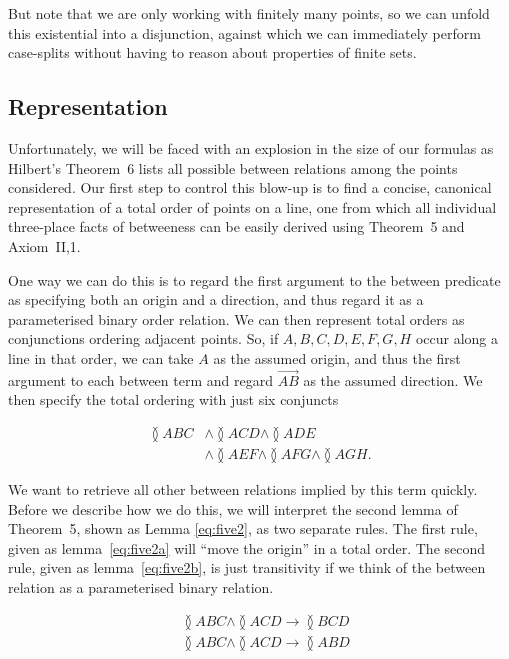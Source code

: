 But note that we are only working with finitely many points, so we can unfold this existential into a disjunction, against which we can immediately perform case-splits without having to reason about properties of finite sets. 

\subsection{Representation}
Unfortunately, we will be faced with an explosion in the size of our formulas as Hilbert's Theorem~6 lists all possible between relations among the points considered. Our first step to control this blow-up is to find a concise, canonical representation of a total order of points on a line, one from which all individual three-place facts of betweeness can be easily derived using Theorem~5 and Axiom~II,1. 

One way we can do this is to regard the first argument to the between predicate as specifying both an origin and a direction, and thus regard it as a parameterised binary order relation. We can then represent total orders as conjunctions ordering adjacent points. So, if $A,B,C,D,E,F,G,H$ occur along a line in that order, we can take $A$ as the assumed origin, and thus the first argument to each between term and regard $\overrightarrow{AB}$ as the assumed direction. We then specify the total ordering with just six conjuncts

\begin{align*}\label{theorem:OrderRepExample}
\between{A}{B}{C}& \wedge \between{A}{C}{D} \wedge \between{A}{D}{E}\tag{$\star$}\\
           &\wedge\between{A}{E}{F}\wedge\between{A}{F}{G}\wedge\between{A}{G}{H}.
\end{align*}

We want to retrieve all other between relations implied by this term quickly. Before we describe how we do this, we will interpret the second lemma of Theorem~5, shown as Lemma \eqref{eq:five2}, as two separate rules. The first rule, given as lemma~\eqref{eq:five2a} will ``move the origin'' in a total order. The second rule, given as lemma~\eqref{eq:five2b}, is just transitivity if we think of the between relation as a parameterised binary relation.

\begin{align}
&\between{A}{B}{C} \wedge \between{A}{C}{D} \rightarrow \between{B}{C}{D}\label{eq:five2a}\\
&\between{A}{B}{C} \wedge \between{A}{C}{D} \rightarrow \between{A}{B}{D}\label{eq:five2b}
\end{align}

